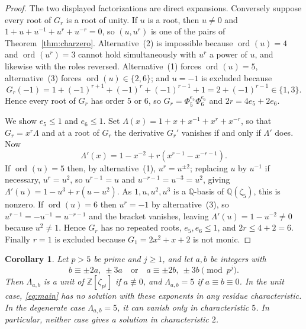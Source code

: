 \documentclass[a4paper]{article}
\newtheorem{corollary}[theorem]{Corollary}
\newcommand{\Z}{\mathbb{Z}}
\newcommand{\Q}{\mathbb{Q}}
\newcommand{\ord}[2][]{\operatorname{ord}_{#1}\!\left(#2\right)}
\begin{document}
\begin{proof}
	The two displayed factorizations are direct expansions.
	Conversely suppose every root of $G_r$ is a root of unity.
	If $u$ is a root, then $u\ne0$ and $1+u+u^{-1}+u^{r}+u^{-r}=0$, so
	$(u,u^{r})$ is one of the pairs of Theorem~\ref{thm:charzero}.
	Alternative~(2) is impossible because $\ord{u}=4$ and $\ord{u^r}=3$
	cannot hold simultaneously with $u^{r}$ a power of $u$, and likewise
	with the roles reversed.
	Alternative~(1) forces $\ord{u}=5$, alternative~(3) forces
	$\ord{u}\in\{2,6\}$; and $u=-1$ is excluded because
	\[
		G_r(-1)=1+(-1)^{r+1}+(-1)^{r}+(-1)^{r-1}+1=2+(-1)^{r-1}\in\{1,3\}.
	\]
	Hence every root of $G_r$ has order $5$ or $6$, so
	$G_r=\Phi_5^{e_5}\Phi_6^{e_6}$ and $2r=4e_5+2e_6$.

	We show $e_5\leq1$ and $e_6\leq1$.
	Set $\Lambda(x)=1+x+x^{-1}+x^{r}+x^{-r}$, so that $G_r=x^{r}\Lambda$ and
	at a root of $G_r$ the derivative $G_r'$ vanishes if and only if
	$\Lambda'$ does.
	Now
	\[
		\Lambda'(x)=1-x^{-2}+r\left(x^{r-1}-x^{-r-1}\right).
	\]
	If $\ord{u}=5$ then, by alternative~(1), $u^{r}=u^{\pm2}$; replacing
	$u$ by $u^{-1}$ if necessary, $u^{r}=u^{2}$, so $u^{r-1}=u$ and
	$u^{-r-1}=u^{-3}=u^{2}$, giving
	$\Lambda'(u)=1-u^{3}+r(u-u^{2})$.
	As $1,u,u^2,u^3$ is a $\Q$-basis of $\Q(\zeta_5)$, this is nonzero.
	If $\ord{u}=6$ then $u^{r}=-1$ by alternative~(3), so
	$u^{r-1}=-u^{-1}=u^{-r-1}$ and the bracket vanishes, leaving
	$\Lambda'(u)=1-u^{-2}\ne0$ because $u^{2}\ne1$.
	Hence $G_r$ has no repeated roots, $e_5,e_6\leq1$, and
	$2r\leq4+2=6$.
	Finally $r=1$ is excluded because $G_1=2x^2+x+2$ is not monic.
\end{proof}

\begin{corollary}\label{cor:units}
	Let $p>5$ be prime and $j\geq1$, and let $a,b$ be integers with
	\[
		b\equiv\pm2a,\ \pm3a
		\quad\text{or}\quad
		a\equiv\pm2b,\ \pm3b
		\pmod{p^j}.
	\]
	Then $\Lambda_{a,b}$ is a unit of $\Z[\zeta_{p^j}]$ if
	$a\not\equiv0$, and $\Lambda_{a,b}=5$ if $a\equiv b\equiv0$.
	In the unit case, \eqref{eq:main} has no solution with these exponents
	in any residue characteristic. In the degenerate case $\Lambda_{a,b}=5$,
	it can vanish only in characteristic $5$. In particular, neither case
	gives a solution in characteristic $2$.
\end{corollary}
\end{document}

